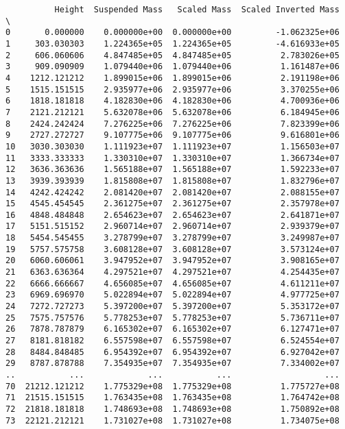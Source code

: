 \documentclass[11pt]{article}
\begin{document}
    \begin{verbatim}
          Height  Suspended Mass   Scaled Mass  Scaled Inverted Mass  \
0       0.000000    0.000000e+00  0.000000e+00         -1.062325e+06   
1     303.030303    1.224365e+05  1.224365e+05         -4.616933e+05   
2     606.060606    4.847485e+05  4.847485e+05          2.783026e+05   
3     909.090909    1.079440e+06  1.079440e+06          1.161487e+06   
4    1212.121212    1.899015e+06  1.899015e+06          2.191198e+06   
5    1515.151515    2.935977e+06  2.935977e+06          3.370255e+06   
6    1818.181818    4.182830e+06  4.182830e+06          4.700936e+06   
7    2121.212121    5.632078e+06  5.632078e+06          6.184945e+06   
8    2424.242424    7.276225e+06  7.276225e+06          7.823399e+06   
9    2727.272727    9.107775e+06  9.107775e+06          9.616801e+06   
10   3030.303030    1.111923e+07  1.111923e+07          1.156503e+07   
11   3333.333333    1.330310e+07  1.330310e+07          1.366734e+07   
12   3636.363636    1.565188e+07  1.565188e+07          1.592233e+07   
13   3939.393939    1.815808e+07  1.815808e+07          1.832796e+07   
14   4242.424242    2.081420e+07  2.081420e+07          2.088155e+07   
15   4545.454545    2.361275e+07  2.361275e+07          2.357978e+07   
16   4848.484848    2.654623e+07  2.654623e+07          2.641871e+07   
17   5151.515152    2.960714e+07  2.960714e+07          2.939379e+07   
18   5454.545455    3.278799e+07  3.278799e+07          3.249987e+07   
19   5757.575758    3.608128e+07  3.608128e+07          3.573124e+07   
20   6060.606061    3.947952e+07  3.947952e+07          3.908165e+07   
21   6363.636364    4.297521e+07  4.297521e+07          4.254435e+07   
22   6666.666667    4.656085e+07  4.656085e+07          4.611211e+07   
23   6969.696970    5.022894e+07  5.022894e+07          4.977725e+07   
24   7272.727273    5.397200e+07  5.397200e+07          5.353172e+07   
25   7575.757576    5.778253e+07  5.778253e+07          5.736711e+07   
26   7878.787879    6.165302e+07  6.165302e+07          6.127471e+07   
27   8181.818182    6.557598e+07  6.557598e+07          6.524554e+07   
28   8484.848485    6.954392e+07  6.954392e+07          6.927042e+07   
29   8787.878788    7.354935e+07  7.354935e+07          7.334002e+07   
..           ...             ...           ...                   ...   
70  21212.121212    1.775329e+08  1.775329e+08          1.775727e+08   
71  21515.151515    1.763435e+08  1.763435e+08          1.764742e+08   
72  21818.181818    1.748693e+08  1.748693e+08          1.750892e+08   
73  22121.212121    1.731027e+08  1.731027e+08          1.734075e+08   

\end{verbatim}
\end{document}
